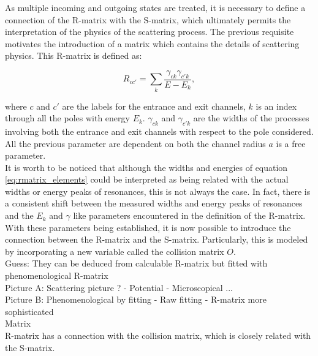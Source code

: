 \documentclass[openany]{book}
\begin{document}
As multiple incoming and outgoing states are treated, it is necessary to define a connection of the R-matrix with the S-matrix, which ultimately permits the interpretation of the physics of the scattering process. The previous requisite motivates the introduction of a matrix which contains the details of scattering physics. This R-matrix is defined as:

\begin{equation}  \label{eq:rmatrix_elements}
	R_{cc'} = \sum_k {\frac{\gamma_{ck} \gamma_{c'k}}{E - E_k}}, 
\end{equation}

where $c$ and $c'$ are the labels for the entrance and exit channels, $k$ is an index through all the poles with energy $E_k$. $\gamma_{ck}$ and $\gamma_{c'k}$ are the widths of the processes involving both the entrance and exit channels with respect to the pole considered. \\

All the previous parameter are dependent on both the channel radius  $a$ is a free parameter.  \\

It is worth to be noticed that although the widths and energies of equation \ref{eq:rmatrix_elements} could be interpreted as being related with the actual widths or energy peaks of resonances, this is not always the case. In fact, there is a consistent shift between the measured widths and energy peaks of resonances and the $E_k$ and $\gamma$ like parameters encountered in the definition of the R-matrix.  \\

With these parameters being established, it is now possible to introduce the connection between the R-matrix and the S-matrix. Particularly, this is modeled by incorporating a new variable called the collision matrix $O$. \\

Guess: They can be deduced from calculable R-matrix
but fitted with phenomenological R-matrix \\

Picture A: Scattering picture ?
	-	Potential 
	-	Microscopical ... \\
	
Picture B: Phenomenological by fitting 
	-	 Raw fitting 
	-	R-matrix more sophisticated  \\

Matrix \\

R-matrix has a connection with the collision matrix, which is closely related with the S-matrix.  \\
\end{document}

